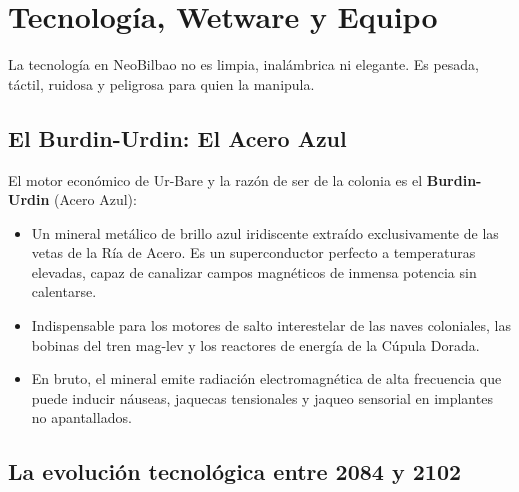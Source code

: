 \chapter{Tecnología, Wetware y Equipo}


La tecnología en NeoBilbao no es limpia, inalámbrica ni elegante. Es pesada, táctil, ruidosa y peligrosa para quien la manipula.

\section{El Burdin-Urdin: El Acero Azul}

El motor económico de Ur-Bare y la razón de ser de la colonia es el \textbf{Burdin-Urdin} (Acero Azul):
\begin{itemize}
  \item {} Un mineral metálico de brillo azul iridiscente extraído exclusivamente de las vetas de la Ría de Acero. Es un superconductor perfecto a temperaturas elevadas, capaz de canalizar campos magnéticos de inmensa potencia sin calentarse.
  \item {} Indispensable para los motores de salto interestelar de las naves coloniales, las bobinas del tren mag-lev y los reactores de energía de la Cúpula Dorada.
  \item {} En bruto, el mineral emite radiación electromagnética de alta frecuencia que puede inducir náuseas, jaquecas tensionales y jaqueo sensorial en implantes no apantallados.
\end{itemize}

\section{La evolución tecnológica entre 2084 y 2102}

